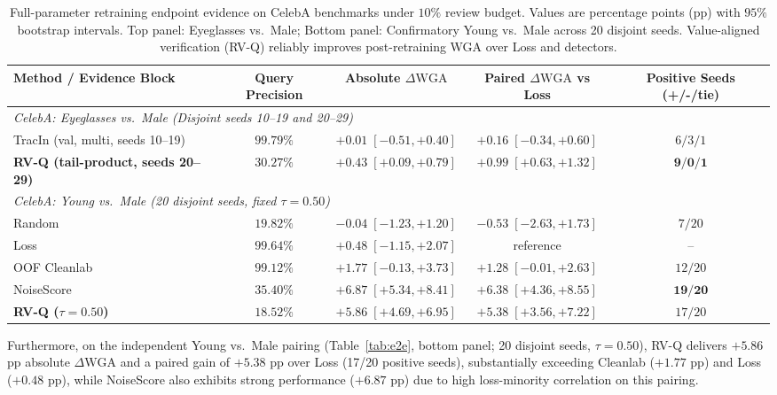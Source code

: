 \documentclass{article}
\newcommand{\dwga}{\ensuremath{\Delta\mathrm{WGA}}}
\begin{document}
\begin{table}[t]
\caption{Full-parameter retraining endpoint evidence on CelebA benchmarks under $10\%$ review budget. Values are percentage points (pp) with $95\%$ bootstrap intervals. Top panel: Eyeglasses vs.\ Male; Bottom panel: Confirmatory Young vs.\ Male across 20 disjoint seeds. Value-aligned verification (RV-Q) reliably improves post-retraining WGA over Loss and detectors.}
\label{tab:e2e}
\label{tab:e2e-young}
\centering
\scriptsize
\setlength{\tabcolsep}{3.5pt}
\begin{tabular}{lcccc}
\toprule
Method / Evidence Block & Query Precision & Absolute $\dwga$ & Paired $\dwga$ vs Loss & Positive Seeds (+/-/tie) \\
\midrule
\multicolumn{5}{l}{\textit{CelebA: Eyeglasses vs.\ Male (Disjoint seeds 10--19 and 20--29)}} \\
TracIn (val, multi, seeds 10--19) & $99.79\%$ & $+0.01\;[-0.51,+0.40]$ & $+0.16\;[-0.34,+0.60]$ & $6/3/1$ \\
\textbf{RV-Q (tail-product, seeds 20--29)} & $30.27\%$ & $\mathbf{+0.43\;[+0.09,+0.79]}$ & $\mathbf{+0.99\;[+0.63,+1.32]}$ & $\mathbf{9/0/1}$ \\
\midrule
\multicolumn{5}{l}{\textit{CelebA: Young vs.\ Male (20 disjoint seeds, fixed $\tau=0.50$)}} \\
Random & $19.82\%$ & $-0.04\;[-1.23,+1.20]$ & $-0.53\;[-2.63,+1.73]$ & $7/20$ \\
Loss & $99.64\%$ & $+0.48\;[-1.15,+2.07]$ & reference & -- \\
OOF Cleanlab & $99.12\%$ & $+1.77\;[-0.13,+3.73]$ & $+1.28\;[-0.01,+2.63]$ & $12/20$ \\
NoiseScore & $35.40\%$ & $\mathbf{+6.87\;[+5.34,+8.41]}$ & $\mathbf{+6.38\;[+4.36,+8.55]}$ & $\mathbf{19/20}$ \\
\textbf{RV-Q ($\tau=0.50$)} & $18.52\%$ & $+5.86\;[+4.69,+6.95]$ & $+5.38\;[+3.56,+7.22]$ & $17/20$ \\
\bottomrule
\end{tabular}
\end{table}

Furthermore, on the independent Young vs.\ Male pairing (Table~\ref{tab:e2e}, bottom panel; 20 disjoint seeds, $\tau=0.50$), RV-Q delivers $+5.86$ pp absolute $\dwga$ and a paired gain of $+5.38$ pp over Loss (17/20 positive seeds), substantially exceeding Cleanlab ($+1.77$ pp) and Loss ($+0.48$ pp), while NoiseScore also exhibits strong performance ($+6.87$ pp) due to high loss-minority correlation on this pairing.
\end{document}
